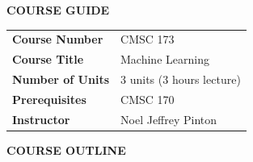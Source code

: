 \documentclass[a4paper,10pt]{article}
\begin{document}
\begin{center}
    \textbf{\Large COURSE GUIDE}
\end{center}
\vspace{0.5em}

\begin{tabular}{ll}
\textbf{Course Number}   & CMSC 173 \\
\textbf{Course Title}    & Machine Learning \\
\textbf{Number of Units} & 3 units (3 hours lecture) \\
\textbf{Prerequisites}   & CMSC 170 \\
\textbf{Instructor}      & Noel Jeffrey Pinton \\
\end{tabular}

\vspace{1.5em}

\begin{center}
    \textbf{\Large COURSE OUTLINE}
\end{center}
\end{document}

